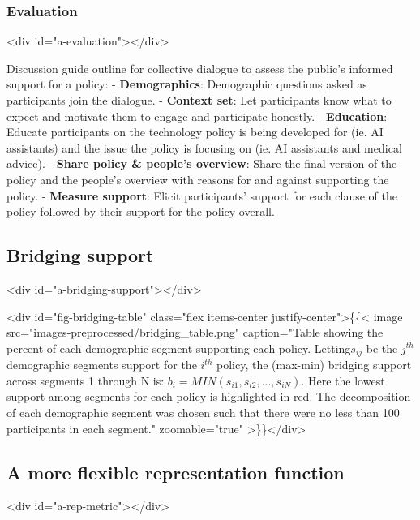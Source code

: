 \documentclass{article}
\begin{document}
\subsubsection{Evaluation}<div id="a-evaluation"></div>

Discussion guide outline for collective dialogue to assess the public's informed support for a policy:
-  \textbf{Demographics}: Demographic questions asked as participants join the dialogue.
-  \textbf{Context set}: Let participants know what to expect and motivate them to engage and participate honestly.
-  \textbf{Education}: Educate participants on the technology policy is being developed for (ie. AI assistants) and the issue the policy is focusing on (ie. AI assistants and medical advice).
-  \textbf{Share policy \& people's overview}: Share the final version of the policy and the people's overview with reasons for and against supporting the policy.
-  \textbf{Measure support}: Elicit participants’ support for each clause of the policy followed by their support for the policy overall.

\subsection{Bridging support}<div id="a-bridging-support"></div>

<div id="fig-bridging-table" class="flex items-center justify-center">\{\{< image src="images-preprocessed/bridging_table.png" caption="Table showing the percent of each demographic segment supporting each policy. Letting$s_{ij}$ be the $j^{th}$ demographic segments support for the $i^{th}$ policy, the (max-min) bridging support across segments 1 through N is: $ b_i = MIN(s_{i1}, s_{i2}, … , s_{iN}) $. Here the lowest support among segments for each policy is highlighted in red. The decomposition of each demographic segment was chosen such that there were no less than 100 participants in each segment." zoomable="true" >\}\}</div>



\subsection{A more flexible representation function}<div id="a-rep-metric"></div>
\end{document}
